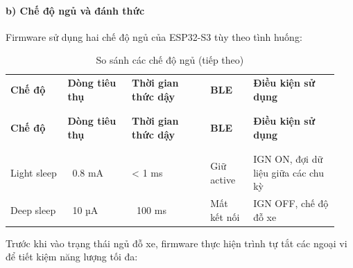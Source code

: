 \documentclass[a4paper]{extarticle}
\newcommand{\thesissettableid}[2]{%
  \renewcommand{\thetable}{#1}%
  \renewcommand{\theHtable}{#2}%
}
\begin{document}
\paragraph{b) Chế độ ngủ và đánh
thức}\label{b-chux1ebf-ux111ux1ed9-ngux1ee7-vuxe0-ux111uxe1nh-thux1ee9c}

Firmware sử dụng hai chế độ ngủ của ESP32-S3 tùy theo tình huống:


{\thesissettableid{4.9}{tab-ch4-so-sanh-cac-che-o-ngu}
\def\LTcaptype{table}
\begin{longtable}{|L{0.162\linewidth}|L{0.181\linewidth}|L{0.225\linewidth}|L{0.128\linewidth}|L{0.249\linewidth}|}
\caption{So sánh các chế độ ngủ}\label{tab:ch4-so-sanh-cac-che-o-ngu}\\
\hline \textbf{Chế độ} & \textbf{Dòng tiêu thụ} & \textbf{Thời gian thức dậy} & \textbf{BLE} & \textbf{Điều kiện sử dụng} \\
\\\hline
\endfirsthead
\caption[]{So sánh các chế độ ngủ (tiếp theo)}\\
\hline \textbf{Chế độ} & \textbf{Dòng tiêu thụ} & \textbf{Thời gian thức dậy} & \textbf{BLE} & \textbf{Điều kiện sử dụng} \\
\\\hline
\endhead
\\\hline
\endfoot
\endlastfoot
Light sleep & ~0.8 mA & \textless{} 1 ms & Giữ active &
IGN ON, đợi dữ liệu giữa các chu kỳ \\\hline
Deep sleep & ~10 µA & ~100 ms & Mất kết nối
& IGN OFF, chế độ đỗ xe \\\hline
\end{longtable}
}


Trước khi vào trạng thái ngủ đỗ xe, firmware thực hiện trình tự tắt các ngoại vi
để tiết kiệm năng lượng tối đa:
\end{document}
